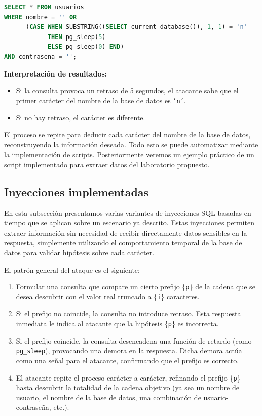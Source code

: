 \documentclass[a4paper,12pt]{article}
\begin{document}
\begin{lstlisting}[language=SQL]
SELECT * FROM usuarios 
WHERE nombre = '' OR 
      (CASE WHEN SUBSTRING((SELECT current_database()), 1, 1) = 'n' 
            THEN pg_sleep(5) 
            ELSE pg_sleep(0) END) -- 
AND contrasena = '';
\end{lstlisting}

\textbf{Interpretación de resultados:}
\begin{itemize}
    \item Si la consulta provoca un retraso de 5 segundos, el atacante sabe que el primer carácter del nombre de la base de datos es \texttt{'n'}.
    \item Si no hay retraso, el carácter es diferente.
\end{itemize}

El proceso se repite para deducir cada carácter del nombre de la base de datos, reconstruyendo la información deseada.
Todo esto se puede automatizar mediante la implementación de scripts. Posteriormente veremos un ejemplo práctico de un script implementado para extraer datos
del laboratorio propuesto.

\subsection{Inyecciones implementadas}

En esta subsección presentamos varias variantes de inyecciones SQL basadas en tiempo que se aplican sobre un escenario ya descrito. Estas inyecciones permiten extraer información sin necesidad de recibir directamente datos sensibles en la respuesta, simplemente utilizando el comportamiento temporal de la base de datos para validar hipótesis sobre cada carácter.

El patrón general del ataque es el siguiente:
\begin{enumerate}
    \item Formular una consulta que compare un cierto prefijo \{\texttt{p}\} de la cadena que se desea descubrir con el valor real truncado a \{\texttt{i}\} caracteres.
    \item Si el prefijo no coincide, la consulta no introduce retraso. Esta respuesta inmediata le indica al atacante que la hipótesis \{\texttt{p}\} es incorrecta.
    \item Si el prefijo coincide, la consulta desencadena una función de retardo (como \texttt{pg\_sleep}), provocando una demora en la respuesta. Dicha demora actúa como una señal para el atacante, confirmando que el prefijo es correcto.
    \item El atacante repite el proceso carácter a carácter, refinando el prefijo \{\texttt{p}\} hasta descubrir la totalidad de la cadena objetivo (ya sea un nombre de usuario, el nombre de la base de datos, una combinación de usuario-contraseña, etc.).
\end{enumerate}
\end{document}
